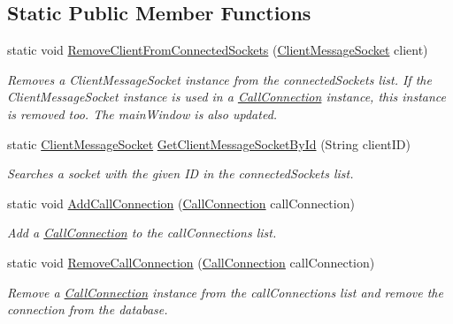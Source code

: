 \subsection*{Static Public Member Functions}
\begin{DoxyCompactItemize}
\item 
static void \hyperlink{class_e_l_i_server_1_1_message_socket_manager_a921b68b4622c90628ae7b179bccdb10c}{Remove\+Client\+From\+Connected\+Sockets} (\hyperlink{class_e_l_i_server_1_1_messaging_1_1_client_message_socket}{Client\+Message\+Socket} client)
\begin{DoxyCompactList}\small\item\em Removes a Client\+Message\+Socket instance from the connected\+Sockets list. If the Client\+Message\+Socket instance is used in a \hyperlink{class_e_l_i_server_1_1_call_connection}{Call\+Connection} instance, this instance is removed too. The main\+Window is also updated. \end{DoxyCompactList}\item 
static \hyperlink{class_e_l_i_server_1_1_messaging_1_1_client_message_socket}{Client\+Message\+Socket} \hyperlink{class_e_l_i_server_1_1_message_socket_manager_aa93a10042f33c7fe76d611346eb80ea0}{Get\+Client\+Message\+Socket\+By\+Id} (String client\+ID)
\begin{DoxyCompactList}\small\item\em Searches a socket with the given ID in the connected\+Sockets list. \end{DoxyCompactList}\item 
static void \hyperlink{class_e_l_i_server_1_1_message_socket_manager_acf805bfb3292019f77e637135009ee78}{Add\+Call\+Connection} (\hyperlink{class_e_l_i_server_1_1_call_connection}{Call\+Connection} call\+Connection)
\begin{DoxyCompactList}\small\item\em Add a \hyperlink{class_e_l_i_server_1_1_call_connection}{Call\+Connection} to the call\+Connections list. \end{DoxyCompactList}\item 
static void \hyperlink{class_e_l_i_server_1_1_message_socket_manager_af591d88e97afd289dfd4f2d89713f5b2}{Remove\+Call\+Connection} (\hyperlink{class_e_l_i_server_1_1_call_connection}{Call\+Connection} call\+Connection)
\begin{DoxyCompactList}\small\item\em Remove a \hyperlink{class_e_l_i_server_1_1_call_connection}{Call\+Connection} instance from the call\+Connections list and remove the connection from the database. \end{DoxyCompactList}\item 

\end{DoxyCompactItemize}
